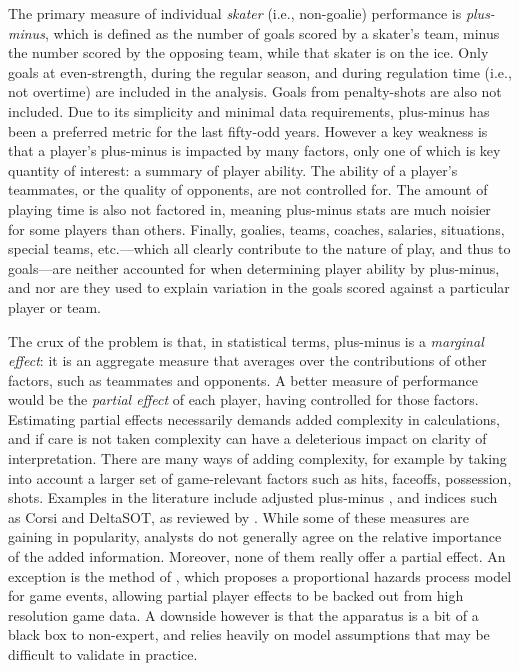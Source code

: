 The primary measure of individual {\em skater} (i.e., non-goalie) performance
is {\em plus-minus}, which is defined as the number of goals scored by a
skater's team, minus the number scored by the opposing team, while that skater
is on the ice.  Only goals at even-strength, during the regular season, and
during regulation time (i.e., not overtime) are included in the analysis.
Goals from penalty-shots are also not included.   Due to its simplicity and
minimal data requirements, plus-minus has been a preferred metric for the last
fifty-odd years.  However a key weakness is that a player's plus-minus is
impacted by many factors, only one of which is key quantity of interest: a
summary of player ability.  The ability of a player's teammates, or the
quality of opponents, are not controlled for.  The amount of playing time is
also not factored in, meaning plus-minus stats are much noisier for some
players than others.  Finally, goalies, teams, coaches, salaries, situations,
special teams, etc.---which all clearly contribute to the nature of play, and
thus to goals---are neither accounted for when determining player ability by
plus-minus, and nor are they used to explain variation in the goals scored
against a particular player or team.  

The crux of the problem is that, in statistical terms, plus-minus is a {\em
marginal effect}: it is an aggregate measure that averages over the
contributions of other factors, such as teammates and opponents.  A better
measure of performance would be the {\em partial effect} of each player,
having controlled for those factors.  Estimating partial effects necessarily
demands added complexity in calculations, and if care is not taken complexity
can have a deleterious impact on clarity of interpretation.  There are many
ways of adding complexity, for example by taking into account a larger set of
game-relevant factors such as hits, faceoffs, possession, shots.  Examples in
the literature include adjusted plus-minus \cite{schlocwel10}, and indices
such as Corsi and DeltaSOT, as reviewed by \cite{vol10}.  While some of these
measures are gaining in popularity, analysts do not generally agree on the
relative importance of the added information.  Moreover, none of them really
offer a partial effect.  An exception is the method of \cite{ThoVenJen12},
which proposes a proportional hazards process model for game events, allowing
partial player effects to be backed out from high resolution game data. A
downside however is that the apparatus is a bit of a black box to non-expert,
and relies heavily on model assumptions that may be difficult to validate in
practice.

